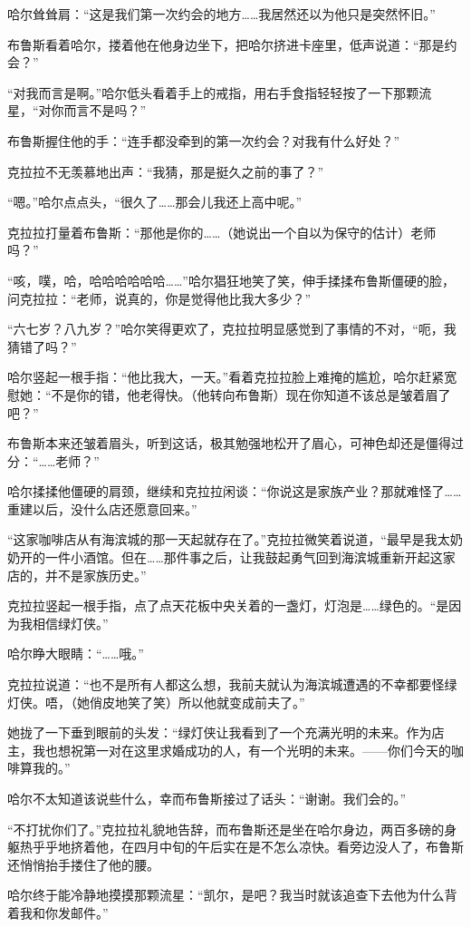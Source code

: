\documentclass[../main]{subfiles}
\begin{document}
哈尔耸耸肩：“这是我们第一次约会的地方……我居然还以为他只是突然怀旧。”

布鲁斯看着哈尔，搂着他在他身边坐下，把哈尔挤进卡座里，低声说道：“那是约会？”

“对我而言是啊。”哈尔低头看着手上的戒指，用右手食指轻轻按了一下那颗流星，“对你而言不是吗？”

布鲁斯握住他的手：“连手都没牵到的第一次约会？对我有什么好处？”

克拉拉不无羡慕地出声：“我猜，那是挺久之前的事了？”

“嗯。”哈尔点点头，“很久了……那会儿我还上高中呢。”

克拉拉打量着布鲁斯：“那他是你的\ldots\ldots（她说出一个自以为保守的估计）老师吗？”

“咳，噗，哈，哈哈哈哈哈哈\ldots\ldots”哈尔猖狂地笑了笑，伸手揉揉布鲁斯僵硬的脸，问克拉拉：“老师，说真的，你是觉得他比我大多少？”

“六七岁？八九岁？”哈尔笑得更欢了，克拉拉明显感觉到了事情的不对，“呃，我猜错了吗？”

哈尔竖起一根手指：“他比我大，一天。”看着克拉拉脸上难掩的尴尬，哈尔赶紧宽慰她：“不是你的错，他老得快。（他转向布鲁斯）现在你知道不该总是皱着眉了吧？”

布鲁斯本来还皱着眉头，听到这话，极其勉强地松开了眉心，可神色却还是僵得过分：“……老师？”

哈尔揉揉他僵硬的肩颈，继续和克拉拉闲谈：“你说这是家族产业？那就难怪了……重建以后，没什么店还愿意回来。”

“这家咖啡店从有海滨城的那一天起就存在了。”克拉拉微笑着说道，“最早是我太奶奶开的一件小酒馆。但在……那件事之后，让我鼓起勇气回到海滨城重新开起这家店的，并不是家族历史。”

克拉拉竖起一根手指，点了点天花板中央关着的一盏灯，灯泡是……绿色的。“是因为我相信绿灯侠。”

哈尔睁大眼睛：“……哦。”

克拉拉说道：“也不是所有人都这么想，我前夫就认为海滨城遭遇的不幸都要怪绿灯侠。唔，（她俏皮地笑了笑）所以他就变成前夫了。”

她拢了一下垂到眼前的头发：“绿灯侠让我看到了一个充满光明的未来。作为店主，我也想祝第一对在这里求婚成功的人，有一个光明的未来。——你们今天的咖啡算我的。”

哈尔不太知道该说些什么，幸而布鲁斯接过了话头：“谢谢。我们会的。”

“不打扰你们了。”克拉拉礼貌地告辞，而布鲁斯还是坐在哈尔身边，两百多磅的身躯热乎乎地挤着他，在四月中旬的午后实在是不怎么凉快。看旁边没人了，布鲁斯还悄悄抬手搂住了他的腰。

哈尔终于能冷静地摸摸那颗流星：“凯尔，是吧？我当时就该追查下去他为什么背着我和你发邮件。”
\end{document}
